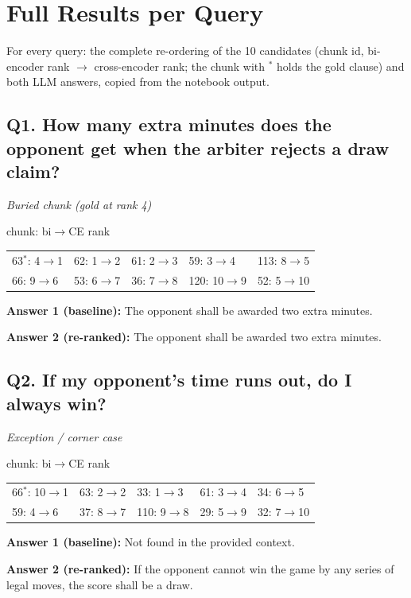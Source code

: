 \appendix

\section{Full Results per Query}

For every query: the complete re-ordering of the 10 candidates (chunk id, bi-encoder rank $\to$ cross-encoder rank; the chunk with $^*$ holds the gold clause) and both LLM answers, copied from the notebook output.\par

\subsection*{Q1. How many extra minutes does the opponent get when the arbiter rejects a draw claim?}
\emph{Buried chunk (gold at rank 4)}\par
{\small chunk: bi$\to$CE rank\par\smallskip \begin{tabular}{@{}lllll@{}}
63$^*$: 4$\to$1 & 62: 1$\to$2 & 61: 2$\to$3 & 59: 3$\to$4 & 113: 8$\to$5 \\
66: 9$\to$6 & 53: 6$\to$7 & 36: 7$\to$8 & 120: 10$\to$9 & 52: 5$\to$10
\end{tabular}}\par\smallskip
\textbf{Answer 1 (baseline):} The opponent shall be awarded two extra minutes.\par
\textbf{Answer 2 (re-ranked):} The opponent shall be awarded two extra minutes.\par

\subsection*{Q2. If my opponent's time runs out, do I always win?}
\emph{Exception / corner case}\par
{\small chunk: bi$\to$CE rank\par\smallskip \begin{tabular}{@{}lllll@{}}
66$^*$: 10$\to$1 & 63: 2$\to$2 & 33: 1$\to$3 & 61: 3$\to$4 & 34: 6$\to$5 \\
59: 4$\to$6 & 37: 8$\to$7 & 110: 9$\to$8 & 29: 5$\to$9 & 32: 7$\to$10
\end{tabular}}\par\smallskip
\textbf{Answer 1 (baseline):} Not found in the provided context.\par
\textbf{Answer 2 (re-ranked):} If the opponent cannot win the game by any series of legal moves, the score shall be a draw.\par

